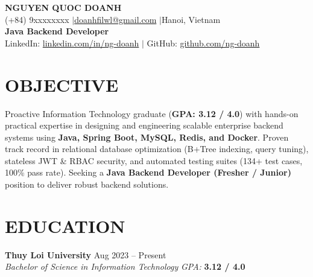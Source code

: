 ﻿\documentclass[10pt,a4paper]{article}
\begin{document}
\begin{center}
    {\Large \textbf{\color{primary} NGUYEN QUOC DOANH}} \\[2.5pt]
    (+84) 9xxxxxxxx \enspace$\vert$\enspace \href{mailto:doanhfilwl@gmail.com}{doanhfilwl@gmail.com} \enspace$\vert$\enspace Hanoi, Vietnam \\[2pt]
    \textbf{Java Backend Developer} \\[2pt]
    LinkedIn: \href{https://linkedin.com/in/ng-doanh}{linkedin.com/in/ng-doanh} \enspace$\vert$\enspace 
    GitHub: \href{https://github.com/ng-doanh}{github.com/ng-doanh}
\end{center}

\vspace{-6pt}

\section*{OBJECTIVE}
Proactive Information Technology graduate (\textbf{GPA: 3.12 / 4.0}) with hands-on practical expertise in designing and engineering scalable enterprise backend systems using \textbf{Java, Spring Boot, MySQL, Redis, and Docker}. Proven track record in relational database optimization (B+Tree indexing, query tuning), stateless JWT \& RBAC security, and automated testing suites (134+ test cases, 100\% pass rate). Seeking a \textbf{Java Backend Developer (Fresher / Junior)} position to deliver robust backend solutions.

\section*{EDUCATION}
\noindent
\textbf{Thuy Loi University} \hfill Aug 2023 -- Present \\
\textit{Bachelor of Science in Information Technology} \hfill \textit{GPA:} \textbf{3.12 / 4.0}

\end{document}
